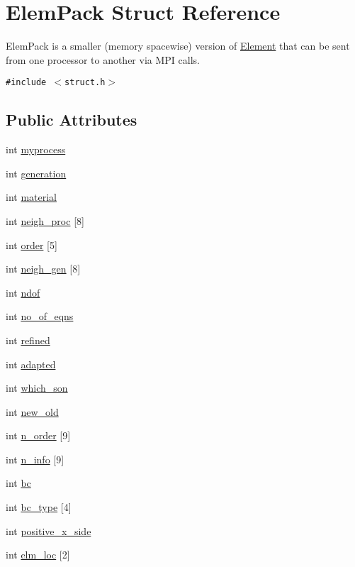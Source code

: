 \hypertarget{structElemPack}{
\section{Elem\-Pack Struct Reference}
\label{structElemPack}
}
Elem\-Pack is a smaller (memory spacewise) version of \hyperlink{classElement}{Element} that can be sent from one processor to another via MPI calls.  


{\tt \#include $<$struct.h$>$}

\subsection*{Public Attributes}
\begin{CompactItemize}
\item 
int \hyperlink{structElemPack_o0}{myprocess}
\item 
int \hyperlink{structElemPack_o1}{generation}
\item 
int \hyperlink{structElemPack_o2}{material}
\item 
int \hyperlink{structElemPack_o3}{neigh\_\-proc} \mbox{[}8\mbox{]}
\item 
int \hyperlink{structElemPack_o4}{order} \mbox{[}5\mbox{]}
\item 
int \hyperlink{structElemPack_o5}{neigh\_\-gen} \mbox{[}8\mbox{]}
\item 
int \hyperlink{structElemPack_o6}{ndof}
\item 
int \hyperlink{structElemPack_o7}{no\_\-of\_\-eqns}
\item 
int \hyperlink{structElemPack_o8}{refined}
\item 
int \hyperlink{structElemPack_o9}{adapted}
\item 
int \hyperlink{structElemPack_o10}{which\_\-son}
\item 
int \hyperlink{structElemPack_o11}{new\_\-old}
\item 
int \hyperlink{structElemPack_o12}{n\_\-order} \mbox{[}9\mbox{]}
\item 
int \hyperlink{structElemPack_o13}{n\_\-info} \mbox{[}9\mbox{]}
\item 
int \hyperlink{structElemPack_o14}{bc}
\item 
int \hyperlink{structElemPack_o15}{bc\_\-type} \mbox{[}4\mbox{]}
\item 
int \hyperlink{structElemPack_o16}{positive\_\-x\_\-side}
\item 
int \hyperlink{structElemPack_o17}{elm\_\-loc} \mbox{[}2\mbox{]}

\end{CompactItemize}
